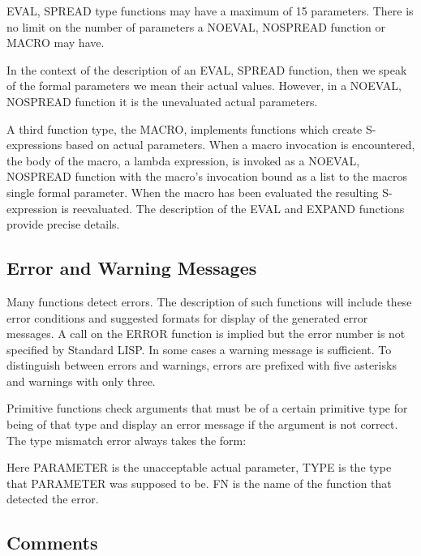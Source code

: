 \documentclass[11pt,letterpaper]{book}
\begin{document}
EVAL, SPREAD type functions may have a maximum of 15 parameters.
There is no limit on the number of parameters a NOEVAL, NOSPREAD
function or MACRO may have.

In the context of the description of an EVAL, SPREAD function, then we
speak of the formal parameters we mean their actual values.  However,
in a NOEVAL, NOSPREAD function it is the unevaluated actual
parameters.

A third function type, the MACRO, implements functions which
create S-expressions based on actual parameters. When a macro
invocation is encountered, the body of the macro, a lambda expression,
is invoked as a NOEVAL, NOSPREAD function with the macro's invocation
bound as a list to the macros single formal parameter. When the macro
has been evaluated the resulting S-expression is reevaluated. The
description of the EVAL and EXPAND
functions provide precise details.


\subsection{Error and Warning Messages}
Many functions detect errors. The description of such functions will
include these error conditions and suggested formats for display
of the generated error messages. A call on the ERROR function is
implied but the error number is not specified by Standard LISP. In
some cases a warning message is sufficient. To distinguish between
 
errors and warnings, errors are prefixed with five asterisks and
warnings with only three.

Primitive functions check arguments that must be of a certain
primitive type for being of that type and display an error message if
the argument is not correct. The type mismatch error always takes the
form:


Here PARAMETER is the unacceptable actual parameter, TYPE is the type
that PARAMETER was supposed to be. FN is the name of the function that
detected the error.

\subsection{Comments}
\end{document}
